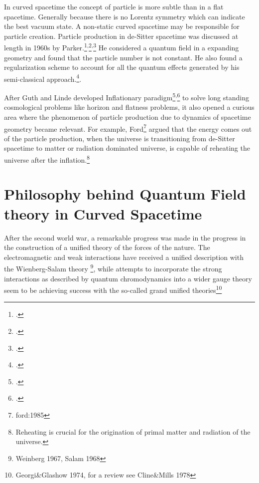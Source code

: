 In curved spacetime the concept of particle is more subtle than in a flat
spacetime. Generally because there is no Lorentz symmetry which can
indicate the best vacuum state. A non-static curved spacetime may be
responsible for particle creation. Particle production in de-Sitter
spacetime was discussed at length in 1960s by
Parker.\footcite{parker:1968}\textsuperscript{,}\footcite{parker:1969}\textsuperscript{,}\footcite{parker:1971}
He considered a quantum field in a expanding geometry and found that the
particle number is not constant. He also found a regularization scheme to
account for all the quantum effects generated by his semi-classical
approach.\footcite[His personal account of his work on particle creation
can consulted for further illumination][]{parker:2012}.

After Guth and Linde developed Inflationary
paradigm\footcite{Guth:1980}\textsuperscript{,}\footcite{Linde:1984} to
solve long standing cosmological problems like horizon and flatness
problems, it also opened a curious area where the phenomenon of particle
production due to dynamics of spacetime geometry became relevant. For
example, Ford\footnote{ford:1985} argued that the energy comes out of the
particle production, when the universe is transitioning from de-Sitter
spacetime to matter or radiation dominated universe, is capable of
reheating the universe after the inflation.\footnote{Reheating is crucial
for the origination of primal matter and radiation of the universe.}

\section{Philosophy behind  Quantum Field theory in Curved Spacetime}

After the second world war, a remarkable progress was made in the progress
in the construction of a unified theory of the forces of the nature. The
electromagnetic and weak interactions have received a unified description
with the Wienberg-Salam theory \footnote{Weinberg 1967, Salam 1968 },
while attempts to incorporate the strong interactions as described by
quantum chromodynamics into a wider gauge theory seem to be achieving
success with the so-called grand unified theories\footnote{Georgi&Glashow
1974, for a review see Cline&Mills
        1978}\par

